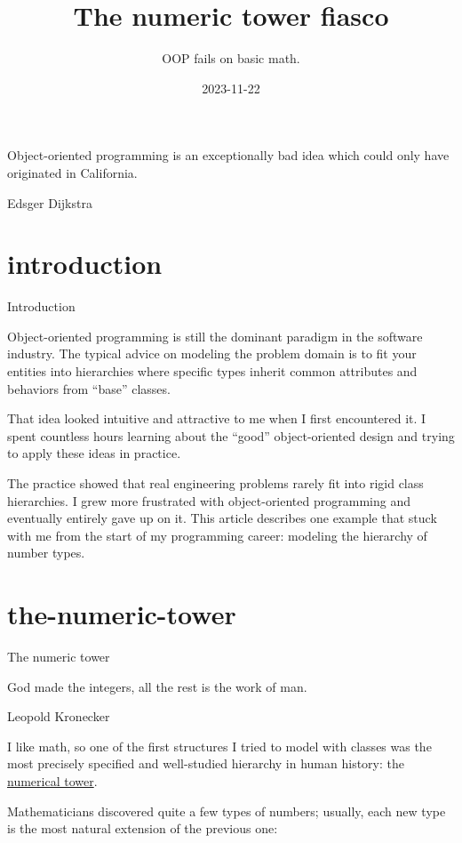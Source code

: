 \documentclass{article}
\title{The numeric tower fiasco}
\subtitle{OOP fails on basic math.}
\date{2023-11-22}
\begin{document}
\epigraph{Object-oriented programming is an exceptionally bad idea which could only have originated in California.}{Edsger Dijkstra}

\section{introduction}{Introduction}

Object-oriented programming is still the dominant paradigm in the software industry.
The typical advice on modeling the problem domain is to fit your entities into hierarchies where specific types inherit common attributes and behaviors from ``base'' classes.

That idea looked intuitive and attractive to me when I first encountered it.
I spent countless hours learning about the ``good'' object-oriented design and trying to apply these ideas in practice.

The practice showed that real engineering problems rarely fit into rigid class hierarchies.
I grew more frustrated with object-oriented programming and eventually entirely gave up on it.
This article describes one example that stuck with me from the start of my programming career: modeling the hierarchy of number types.

\section{the-numeric-tower}{The numeric tower}

\epigraph{God made the integers, all the rest is the work of man.}{Leopold Kronecker}

I like math, so one of the first structures I tried to model with classes was the most precisely specified and well-studied hierarchy in human history: the \href{https://en.wikipedia.org/wiki/Numerical_tower}{numerical tower}.

Mathematicians discovered quite a few types of numbers; usually, each new type is the most natural extension of the previous one:
\end{document}
